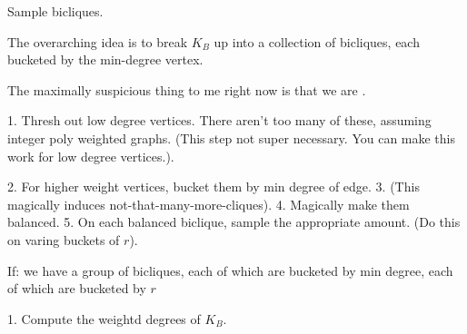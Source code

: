 Sample bicliques.

The overarching idea is to break $K_B$ up into a collection of bicliques, each
bucketed by the min-degree vertex.

The maximally suspicious thing to me right now is that we are .

1. Thresh out low degree vertices. There aren't too many of these, assuming
integer poly weighted graphs. (This step not super necessary. You can make this
    work for low degree vertices.).

2. For higher weight vertices, bucket them by min degree of edge.
3. (This magically induces not-that-many-more-cliques).
4. Magically make them balanced.
5. On each balanced biclique, sample the appropriate amount. (Do this on varing
    buckets of $r$).

If: we have a group of bicliques, each of which are bucketed by min degree, each
of which are bucketed by $r$

1. Compute the weightd degrees of $K_B$.
